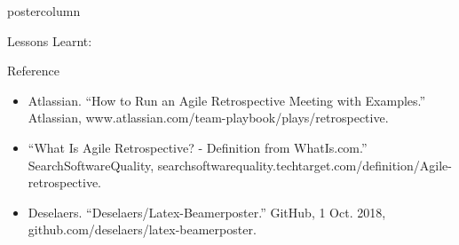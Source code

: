 \documentclass[final,hyperref={pdfpagelabels=false}]{beamer}
\begin{document}
\begin{frame}
\begin{columns}
\begin{column}{.49\textwidth}
\begin{beamercolorbox}[center,wd=\textwidth]{postercolumn}
\begin{minipage}[T]{.95\textwidth}
{\begin{block}{Lessons Learnt: }
            \end{block}
            \vfill
              \begin{block}{Reference}
              \begin{itemize}
              \item Atlassian. “How to Run an Agile Retrospective Meeting with Examples.” Atlassian, www.atlassian.com/team-playbook/plays/retrospective.
            \item “What Is Agile Retrospective? - Definition from WhatIs.com.” SearchSoftwareQuality, searchsoftwarequality.techtarget.com/definition/Agile-retrospective.
            \item Deselaers. “Deselaers/Latex-Beamerposter.” GitHub, 1 Oct. 2018, github.com/deselaers/latex-beamerposter.
              \end{itemize}              
            
            \end{block}
          }
        \end{minipage}
      \end{beamercolorbox}
    \end{column}
  \end{columns}
  \end{frame}
\end{document}
